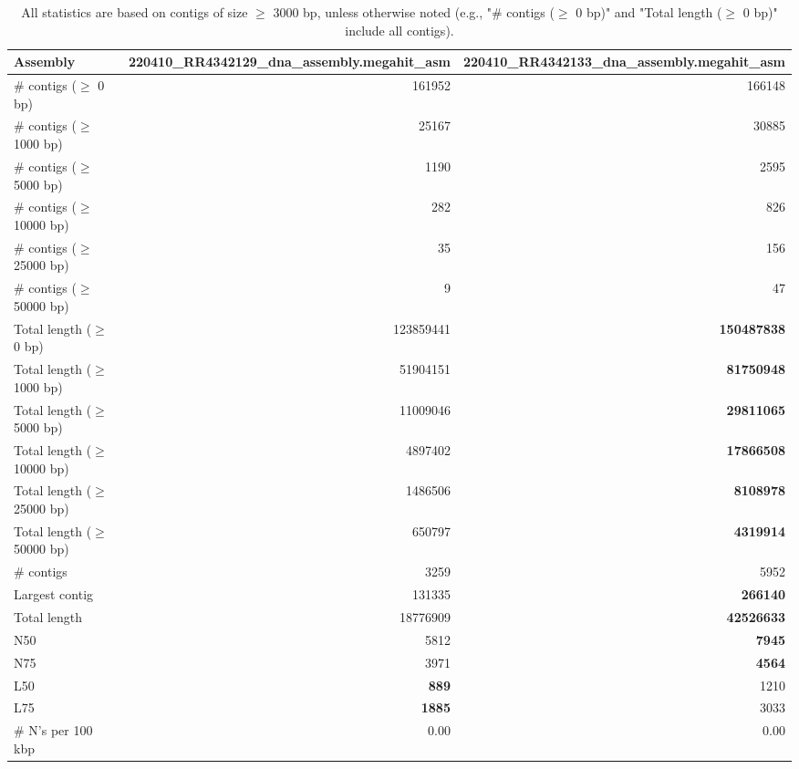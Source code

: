 \documentclass[12pt,a4paper]{article}
\begin{document}
\begin{table}[ht]
\begin{center}
\caption{All statistics are based on contigs of size $\geq$ 3000 bp, unless otherwise noted (e.g., "\# contigs ($\geq$ 0 bp)" and "Total length ($\geq$ 0 bp)" include all contigs).}
\begin{tabular}{|l*{2}{|r}|}
\hline
Assembly & 220410\_RR4342129\_dna\_assembly.megahit\_asm & 220410\_RR4342133\_dna\_assembly.megahit\_asm \\ \hline
\# contigs ($\geq$ 0 bp) & 161952 & 166148 \\ \hline
\# contigs ($\geq$ 1000 bp) & 25167 & 30885 \\ \hline
\# contigs ($\geq$ 5000 bp) & 1190 & 2595 \\ \hline
\# contigs ($\geq$ 10000 bp) & 282 & 826 \\ \hline
\# contigs ($\geq$ 25000 bp) & 35 & 156 \\ \hline
\# contigs ($\geq$ 50000 bp) & 9 & 47 \\ \hline
Total length ($\geq$ 0 bp) & 123859441 & {\bf 150487838} \\ \hline
Total length ($\geq$ 1000 bp) & 51904151 & {\bf 81750948} \\ \hline
Total length ($\geq$ 5000 bp) & 11009046 & {\bf 29811065} \\ \hline
Total length ($\geq$ 10000 bp) & 4897402 & {\bf 17866508} \\ \hline
Total length ($\geq$ 25000 bp) & 1486506 & {\bf 8108978} \\ \hline
Total length ($\geq$ 50000 bp) & 650797 & {\bf 4319914} \\ \hline
\# contigs & 3259 & 5952 \\ \hline
Largest contig & 131335 & {\bf 266140} \\ \hline
Total length & 18776909 & {\bf 42526633} \\ \hline
N50 & 5812 & {\bf 7945} \\ \hline
N75 & 3971 & {\bf 4564} \\ \hline
L50 & {\bf 889} & 1210 \\ \hline
L75 & {\bf 1885} & 3033 \\ \hline
\# N's per 100 kbp & 0.00 & 0.00 \\ \hline
\end{tabular}
\end{center}
\end{table}
\end{document}
